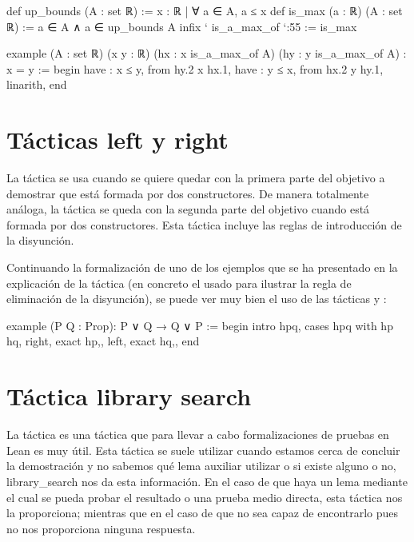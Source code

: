 \begin{leancode}
def up_bounds (A : set ℝ) := { x : ℝ | ∀ a ∈ A, a ≤ x}
def is_max (a : ℝ) (A : set ℝ) := a ∈ A ∧ a ∈ up_bounds A
infix ` is_a_max_of `:55 := is_max

example
  (A : set ℝ)
  (x y : ℝ)
  (hx : x is_a_max_of A)
  (hy : y is_a_max_of A)
  : x = y :=
begin
  have : x ≤ y, from hy.2 x hx.1,
  have : y ≤ x, from hx.2 y hy.1,
  linarith,
end
\end{leancode}

\section{Tácticas left y right}

La táctica  se usa cuando se quiere quedar
con la primera parte del objetivo a demostrar que está formada por dos
constructores.  De manera totalmente análoga, la táctica
 se queda con la segunda parte del
objetivo cuando está formada por dos constructores. Esta táctica
incluye las reglas de introducción de la disyunción.

Continuando la formalización de uno de los ejemplos que se ha presentado
en la explicación de la táctica  (en concreto el
usado para ilustrar la regla de eliminación de la disyunción), se puede
ver muy bien el uso de las tácticas  y
:
\begin{leancode}
example (P Q : Prop): P ∨ Q → Q ∨ P :=
begin
  intro hpq,
  cases hpq with hp hq,
  { right,
    exact hp,},
  { left,
    exact hq,},
end
\end{leancode}

\section{Táctica library search}

La táctica  es una táctica que
para llevar a cabo formalizaciones de pruebas en Lean es muy útil. Esta
táctica se suele utilizar cuando estamos cerca de concluir la
demostración y no sabemos qué lema auxiliar utilizar o si existe alguno
o no,  {library\_search} nos da esta
información. En el caso de que haya un lema mediante el cual se pueda
probar el resultado o una prueba medio directa, esta táctica nos la
proporciona; mientras que en el caso de que no sea capaz de encontrarlo
pues no nos proporciona ninguna respuesta.

